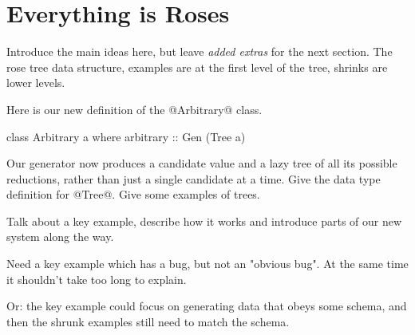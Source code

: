 \section{Everything is Roses}

Introduce the main ideas here, but leave \emph{added extras} for the next section. The rose tree data structure, examples are at the first level of the tree, shrinks are lower levels.

Here is our new definition of the @Arbitrary@ class.

\begin{code}
class Arbitrary a where
   arbitrary :: Gen (Tree a)
\end{code}

Our generator now produces a candidate value and a lazy tree of all its possible reductions, rather than just a single candidate at a time. Give the data type definition for @Tree@. Give some examples of trees.

Talk about a key example, describe how it works and introduce parts of our new system along the way.

Need a key example which has a bug, but not an "obvious bug". At the same time it shouldn't take too long to explain.

Or: the key example could focus on generating data that obeys some schema, and then the shrunk examples still need to match the schema.
